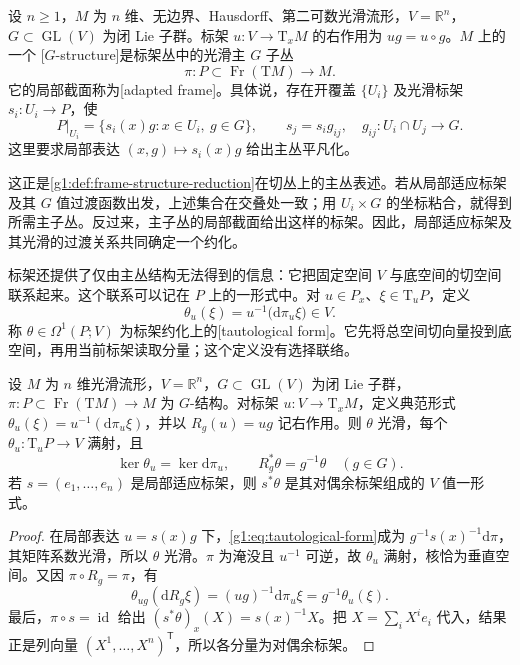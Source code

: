 \begin{definition}
	\label{g1:def:g-structure}
	设 \(n\ge1\)，\(M\) 为 \(n\) 维、无边界、Hausdorff、第二可数光滑流形，\(V=\mathbb R^n\)，\(G\subset\operatorname{GL}(V)\) 为闭 Lie 子群。标架 \(u:V\to\mathrm T_xM\) 的右作用为 \(ug=u\circ g\)。\(M\) 上的一个 [\(G\)-structure]是标架丛中的光滑主 \(G\) 子丛
	\[
		\pi:P\subset\operatorname{Fr}(\mathrm{T}M)\longrightarrow M.
	\]
	它的局部截面称为[adapted frame]。具体说，存在开覆盖 \(\{U_i\}\) 及光滑标架 \(s_i:U_i\to P\)，使
	\[
		P|_{U_i}=\{s_i(x)g:x\in U_i,\ g\in G\},
		\qquad s_j=s_i g_{ij},\quad g_{ij}:U_i\cap U_j\to G.
	\]
	这里要求局部表达 \((x,g)\mapsto s_i(x)g\) 给出主丛平凡化。
\end{definition}

这正是\cref{g1:def:frame-structure-reduction}在切丛上的主丛表述。若从局部适应标架及其 \(G\) 值过渡函数出发，上述集合在交叠处一致；用 \(U_i\times G\) 的坐标粘合，就得到所需主子丛。反过来，主子丛的局部截面给出这样的标架。因此，局部适应标架及其光滑的过渡关系共同确定一个约化。

\ProseParagraphBreak

标架还提供了仅由主丛结构无法得到的信息：它把固定空间 \(V\) 与底空间的切空间联系起来。这个联系可以记在 \(P\) 上的一形式中。对 \(u\in P_x\)、\(\xi\in\mathrm{T}_uP\)，定义
\begin{equation}
	\label{g1:eq:tautological-form}
	\theta_u(\xi)=u^{-1}\bigl(\mathrm{d}\pi_u\xi\bigr)\in V.
\end{equation}
称 \(\theta\in\Omega^1(P;V)\) 为标架约化上的[tautological form]。它先将总空间切向量投到底空间，再用当前标架读取分量；这个定义没有选择联络。

\begin{proposition}
	\label{g1:prop:tautological-form-properties}
	设 \(M\) 为 \(n\) 维光滑流形，\(V=\mathbb R^n\)，\(G\subset\operatorname{GL}(V)\) 为闭 Lie 子群，\(\pi:P\subset\operatorname{Fr}(\mathrm{T}M)\to M\) 为 \(G\)-结构。对标架 \(u:V\to\mathrm T_xM\)，定义典范形式 \(\theta_u(\xi)=u^{-1}(\mathrm d\pi_u\xi)\)，并以 \(R_g(u)=ug\) 记右作用。则 \(\theta\) 光滑，每个 \(\theta_u:\mathrm{T}_uP\to V\) 满射，且
	\[
		\ker\theta_u=\ker\mathrm{d}\pi_u,\qquad
		R_g^*\theta=g^{-1}\theta\quad(g\in G).
	\]
	若 \(s=(e_1,\ldots,e_n)\) 是局部适应标架，则 \(s^*\theta\) 是其对偶余标架组成的 \(V\) 值一形式。
\end{proposition}
\begin{proof}
	在局部表达 \(u=s(x)g\) 下，\eqref{g1:eq:tautological-form}成为 \(g^{-1}s(x)^{-1}\mathrm{d}\pi\)，其矩阵系数光滑，所以 \(\theta\) 光滑。\(\pi\) 为淹没且 \(u^{-1}\) 可逆，故 \(\theta_u\) 满射，核恰为垂直空间。又因 \(\pi\circ R_g=\pi\)，有
	\[
		\theta_{ug}(\mathrm{d}R_g\xi)
		=(ug)^{-1}\mathrm{d}\pi_u\xi
		=g^{-1}\theta_u(\xi).
	\]
	最后，\(\pi\circ s=\operatorname{id}\) 给出 \((s^*\theta)_x(X)=s(x)^{-1}X\)。把 \(X=\sum_iX^ie_i\) 代入，结果正是列向量 \((X^1,\ldots,X^n)^{\mathsf T}\)，所以各分量为对偶余标架。
\end{proof}

